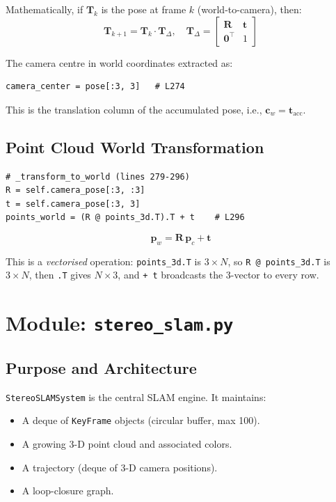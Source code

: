 \documentclass[12pt,a4paper,twoside]{report}
\theoremstyle{definition}
\newcommand{\vect}[1]{\bm{#1}}
\newcommand{\mat}[1]{\mathbf{#1}}
\newcommand{\T}{\top}           %
\newcommand{\code}[1]{\texttt{#1}}
\begin{document}
Mathematically, if $\mat{T}_k$ is the pose at frame $k$ (world-to-camera), then:
\[
  \mat{T}_{k+1} = \mat{T}_k \cdot \mat{T}_{\Delta}, \quad
  \mat{T}_\Delta = \begin{bmatrix}\mat{R} & \vect{t}\\\vect{0}^\T & 1\end{bmatrix}
\]

The camera centre in world coordinates extracted as:
\begin{lstlisting}
camera_center = pose[:3, 3]   # L274
\end{lstlisting}
This is the translation column of the accumulated pose, i.e.,
$\vect{c}_w = \vect{t}_\text{acc}$.

\section{Point Cloud World Transformation}

\begin{lstlisting}
# _transform_to_world (lines 279-296)
R = self.camera_pose[:3, :3]
t = self.camera_pose[:3, 3]
points_world = (R @ points_3d.T).T + t    # L296
\end{lstlisting}

\[
  \vect{p}_w = \mat{R}\,\vect{p}_c + \vect{t}
\]

This is a \emph{vectorised} operation: \code{points\_3d.T} is $3\times N$,
so \code{R @ points\_3d.T} is $3\times N$, then \code{.T} gives $N\times3$,
and \code{+ t} broadcasts the $3$-vector to every row.

\chapter{Module: \texttt{stereo\_slam.py}}

\section{Purpose and Architecture}

\code{StereoSLAMSystem} is the central SLAM engine. It maintains:
\begin{itemize}
  \item A deque of \code{KeyFrame} objects (circular buffer, max 100).
  \item A growing 3-D point cloud and associated colors.
  \item A trajectory (deque of 3-D camera positions).
  \item A loop-closure graph.
\end{itemize}
\end{document}
